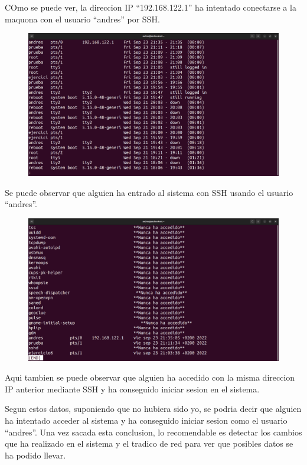 \documentclass{article}
\begin{document}
COmo se puede ver, la direccion IP ``192.168.122.1'' ha intentado conectarse a la maquona con el usuario ``andres'' por SSH. 

\begin{figure}[H]
    \includegraphics[width=\textwidth]{imagenes/lastip.png}
\end{figure}

Se puede observar que alguien ha entrado al sistema con SSH usando el usuario ``andres''.

\begin{figure}[H]
    \includegraphics[width=\textwidth]{imagenes/lastlogip.png}
\end{figure}

Aqui tambien se puede observar que alguien ha accedido con la misma direccion IP anterior mediante SSH y ha conseguido iniciar sesion en el sistema.

Segun estos datos, suponiendo que no hubiera sido yo, se podria decir que alguien ha intentado acceder al sistema y ha conseguido iniciar sesion como el usuario ``andres''. Una vez sacada esta conclusion, lo recomendable es detectar los cambios que ha realizado en el sistema y el tradico de red para ver que posibles datos se ha podido llevar.
\end{document}
